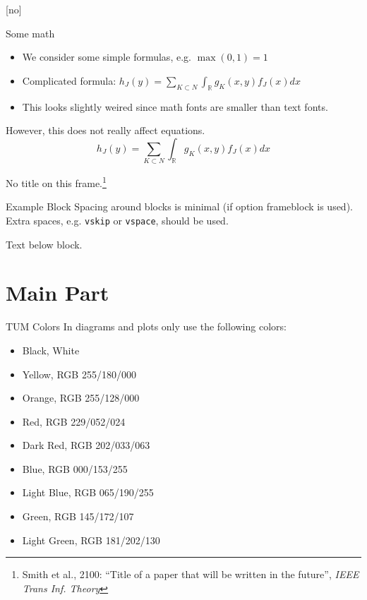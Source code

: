 \documentclass[10pt,t]{beamer}
\begin{document}
{
    [no]
    \begin{frame}{Some math}
        \begin{itemize}
            \item We consider some simple formulas, e.g. $\max(0,1) = 1$
            \item Complicated formula: $h_J(y) = \sum_{K\subset N}\int_{\mathbb{R}}g_K(x,y)f_J(x)dx$
            \item This looks slightly weired since math fonts are smaller than text fonts.
        \end{itemize}

        However, this does not really affect equations.
        \begin{equation*}
            h_J(y) = \sum_{K\subset N}\int_{\mathbb{R}}g_K(x,y)f_J(x)dx
        \end{equation*}
    \end{frame}
}

\begin{frame}{}
    No title on this frame.\footnote{Smith et al., 2100: ``Title of a paper that will be written in the future'', \itshape IEEE Trans Inf. Theory}

    \begin{exampleblock}{Example Block}
        Spacing around blocks is minimal (if option frameblock is used).
        Extra spaces, e.g. \texttt{vskip} or \texttt{vspace}, should be used.
    \end{exampleblock}

    Text below block.

\end{frame}


\section{Main Part}


\begin{frame}{TUM Colors}
    In diagrams and plots only use the following colors:
    \begin{itemize}
        \item Black, White
        \item \textcolor{TUMBeamerYellow}{Yellow, RGB 255/180/000}
        \item \textcolor{TUMBeamerOrange}{Orange, RGB 255/128/000}
        \item \textcolor{TUMBeamerRed}{Red, RGB 229/052/024}
        \item \textcolor{TUMBeamerDarkRed}{Dark Red, RGB 202/033/063}
        \item \textcolor{TUMBeamerBlue}{Blue, RGB 000/153/255}
        \item \textcolor{TUMBeamerLightBlue}{Light Blue, RGB 065/190/255}
        \item \textcolor{TUMBeamerGreen}{Green, RGB 145/172/107}
        \item \textcolor{TUMBeamerLightGreen}{Light Green, RGB 181/202/130}
    \end{itemize}
\end{frame}
\end{document}
